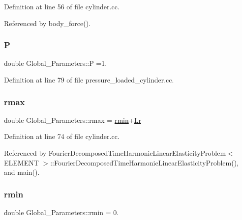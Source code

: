 Definition at line 56 of file cylinder.\+cc.



Referenced by body\+\_\+force().

\mbox{\label{namespaceGlobal__Parameters_a31fb55c20db4aa0127aafa20f0d76731}} 
\subsubsection{\texorpdfstring{P}{P}}
{\footnotesize\ttfamily double Global\+\_\+\+Parameters\+::P =1.}



Definition at line 79 of file pressure\+\_\+loaded\+\_\+cylinder.\+cc.

\mbox{\label{namespaceGlobal__Parameters_a5d7fb394c980bb4bf2a52158f9d7cc50}} 
\subsubsection{\texorpdfstring{rmax}{rmax}}
{\footnotesize\ttfamily double Global\+\_\+\+Parameters\+::rmax = \hyperlink{namespaceGlobal__Parameters_ad454d80ae621f272dd1d7932249545a5}{rmin}+\hyperlink{namespaceGlobal__Parameters_a444f5c911c8805ad2ba45ed8b1b8904e}{Lr}}



Definition at line 74 of file cylinder.\+cc.



Referenced by Fourier\+Decomposed\+Time\+Harmonic\+Linear\+Elasticity\+Problem$<$ E\+L\+E\+M\+E\+N\+T $>$\+::\+Fourier\+Decomposed\+Time\+Harmonic\+Linear\+Elasticity\+Problem(), and main().

\mbox{\label{namespaceGlobal__Parameters_ad454d80ae621f272dd1d7932249545a5}} 
\subsubsection{\texorpdfstring{rmin}{rmin}}
{\footnotesize\ttfamily double Global\+\_\+\+Parameters\+::rmin = 0.}



